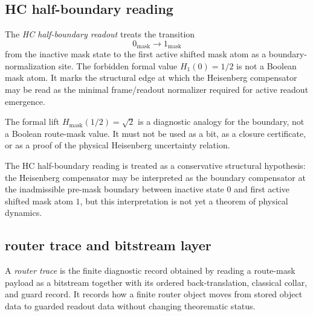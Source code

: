 \subsection*{HC half-boundary reading}
\label{subsec:v3360-r16-hc-half-boundary-reading}

\begin{definition}
\label{def:v3360-r16-hc-half-boundary-readout}
The \emph{HC half-boundary readout} treats the transition
\[
 0_{\mathrm{mask}}\longrightarrow 1_{\mathrm{mask}}
\]
from the inactive mask state to the first active shifted mask atom as a boundary-normalization site. The forbidden formal value $H_1(0)=1/2$ is not a Boolean mask atom. It marks the structural edge at which the Heisenberg compensator may be read as the minimal frame/readout normalizer required for active readout emergence.
\end{definition}

\begin{remark}
\label{rem:v3360-r16-non-boolean-boundary-lift}
The formal lift $H_{\mathrm{mask}}(1/2)=\sqrt{2}$ is a diagnostic analogy for the boundary, not a Boolean route-mask value. It must not be used as a bit, as a closure certificate, or as a proof of the physical Heisenberg uncertainty relation.
\end{remark}

\begin{assumption}
\label{ass:v3360-r16-hc-boundary-reading-hypothesis}
The HC half-boundary reading is treated as a conservative structural hypothesis: the Heisenberg compensator may be interpreted as the boundary compensator at the inadmissible pre-mask boundary between inactive state $0$ and first active shifted mask atom $1$, but this interpretation is not yet a theorem of physical dynamics.
\end{assumption}

\subsection*{router trace and bitstream layer}
\label{subsec:v3360-r16-router-trace-bitstream-layer}

\begin{definition}
\label{def:v3360-r16-router-trace}
A \emph{router trace} is the finite diagnostic record obtained by reading a route-mask payload as a bitstream together with its ordered back-translation, classical collar, and guard record. It records how a finite router object moves from stored object data to guarded readout data without changing theorematic status.
\end{definition}

